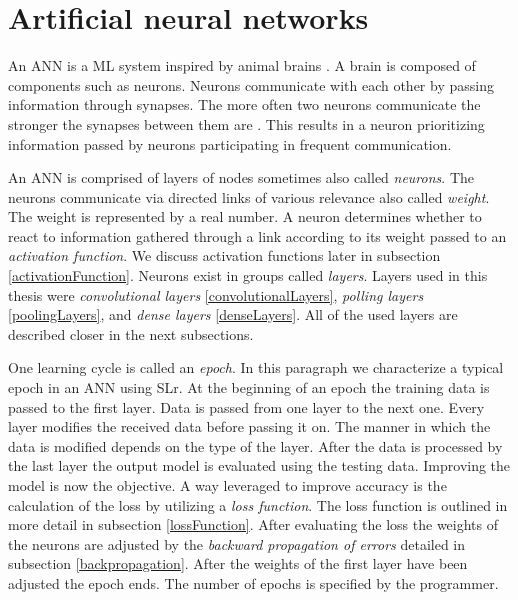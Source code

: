 \section{Artificial neural networks} \label{artificialNeuralNetworks}
An ANN is a ML system inspired by animal brains \cite{machineLeraningApproaches}. A brain is composed of components such as neurons. Neurons communicate with each other by passing information through synapses. The more often two neurons communicate the stronger the synapses between them are \cite{neuronsInBrain}. This results in a neuron prioritizing information passed by neurons participating in frequent communication. 

An ANN is comprised of layers of nodes sometimes also called \textit{neurons}. The neurons communicate via directed links of various relevance also called \textit{weight}. The weight is represented by a real number. A neuron determines whether to react to information gathered through a link according to its weight passed to an \textit{activation function}. We discuss activation functions later in subsection \ref{activationFunction}. Neurons exist in groups called \textit{layers}. Layers used in this thesis were \textit{convolutional layers} \ref{convolutionalLayers}, \textit{polling layers} \ref{poolingLayers}, and \textit{dense layers} \ref{denseLayers}. All of the used layers are described closer in the next subsections. 

One learning cycle is called an \textit{epoch}. In this paragraph we characterize a typical epoch in an ANN using SLr. At the beginning of an epoch the training data is passed to the first layer. Data is passed from one layer to the next one. Every layer modifies the received data before passing it on. The manner in which the data is modified depends on the type of the layer. After the data is processed by the last layer the output model is evaluated using the testing data. Improving the model is now the objective. A way leveraged to improve accuracy is the calculation of the loss by utilizing a \textit{loss function}. The loss function is outlined in more detail in subsection \ref{lossFunction}. After evaluating the loss the weights of the neurons are adjusted by the \textit{backward propagation of errors} detailed in subsection \ref{backpropagation}. After the weights of the first layer have been adjusted the epoch ends. The number of epochs is specified by the programmer. 

